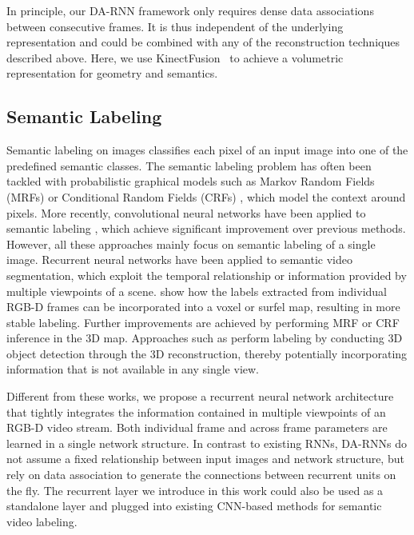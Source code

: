 \documentclass[conference]{IEEEtran}
\begin{document}
In principle, our DA-RNN framework only requires dense data associations between consecutive frames.  It is thus independent of the underlying representation and could be combined with any of the reconstruction techniques described above. Here, we use KinectFusion~\cite{newcombe2011kinectfusion} to achieve a volumetric representation for geometry and semantics. 

\subsection{Semantic Labeling}

Semantic labeling on images classifies each pixel of an input image into one of the predefined semantic classes. The semantic labeling problem has often been tackled with probabilistic graphical models such as Markov Random Fields (MRFs) or Conditional Random Fields (CRFs) \cite{shotton2006textonboost,krahenbuhl2011efficient}, which model the context around pixels. More recently, convolutional neural networks have been applied to semantic labeling \cite{long2015fully,zheng2015conditional,badrinarayanan2015segnet,chen2016deeplab}, which achieve significant improvement over previous methods. However, all these approaches mainly focus on semantic labeling of a single image. Recurrent neural networks \cite{pavel2015recurrent,shelhamer2016clockwork} have been applied to semantic video segmentation, which exploit the temporal relationship or information provided by multiple viewpoints of a scene. \cite{Lai13Obj,mccormac2016semanticfusion} show how the labels extracted from individual RGB-D frames can be incorporated into a voxel or surfel map, resulting in more stable labeling. Further improvements are achieved by performing MRF or CRF inference in the 3D map. Approaches such as \cite{salas2013slam++,lai2014unsupervised,song2016deep} perform labeling by conducting 3D object detection through the 3D reconstruction, thereby potentially incorporating information that is not available in any single view.

Different from these works, we propose a recurrent neural network architecture that tightly integrates the information contained in multiple viewpoints of an RGB-D video stream.  Both individual frame and across frame parameters are learned in a single network structure. In contrast to existing RNNs, DA-RNNs do not assume a fixed relationship between input images and network structure, but rely on data association to generate the connections between recurrent units on the fly.  The recurrent layer we introduce in this work could also be used as a standalone layer and plugged into existing CNN-based methods for semantic video labeling.
\end{document}
